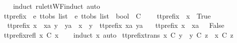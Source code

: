 \begin{isabellebody}
%
\isadelimproof
\ \ %
\endisadelimproof
%
\isatagproof
{}\isamarkupfalse%
\ {\isacharparenleft}induct\ rule{\isacharcolon}ttWF{}{\isachardot}induct{\isacharcomma}\ auto{\isacharparenright}%
\endisatagproof
{\isafoldproof}%
%
\isadelimproof
%
\endisadelimproof
%
\isadelimdocument
%
\endisadelimdocument
%
\isatagdocument
%
\isamarkuptrue%
%
\isamarkuptrue%
%
\endisatagdocument
{\isafolddocument}%
%
\isadelimdocument
%
\endisadelimdocument
{}\isamarkupfalse%
\ tt{\isacharunderscore}prefix\ {\isacharcolon}{\isacharcolon}\ {\isachardoublequoteopen}{\isacharprime}e\ ttobs\ list\ {\isasymRightarrow}\ {\isacharprime}e\ ttobs\ list\ {\isasymRightarrow}\ bool{\isachardoublequoteclose}\ {\isacharparenleft}\ {\isachardoublequoteopen}{\isasymle}\isactrlsub C{\isachardoublequoteclose}\ {}{}{\isacharparenright}\ \isanewline
\ \ {\isachardoublequoteopen}tt{\isacharunderscore}prefix\ {\isacharbrackleft}{\isacharbrackright}\ x\ {\isacharequal}\ True{\isachardoublequoteclose}\ {\isacharbar}\isanewline
\ \ {\isachardoublequoteopen}tt{\isacharunderscore}prefix\ {\isacharparenleft}x\ {\isacharhash}\ xa{\isacharparenright}\ {\isacharparenleft}y\ {\isacharhash}\ ya{\isacharparenright}\ {\isacharequal}\ {\isacharparenleft}x\ {\isacharequal}\ y\ {\isasymand}\ tt{\isacharunderscore}prefix\ xa\ ya{\isacharparenright}{\isachardoublequoteclose}\ {\isacharbar}\isanewline
\ \ {\isachardoublequoteopen}tt{\isacharunderscore}prefix\ {\isacharparenleft}x\ {\isacharhash}\ xa{\isacharparenright}\ {\isacharbrackleft}{\isacharbrackright}\ {\isacharequal}\ False{\isachardoublequoteclose}\isanewline
\isanewline
{}\isamarkupfalse%
\ tt{\isacharunderscore}prefix{\isacharunderscore}refl{\isacharcolon}\ {\isachardoublequoteopen}x\ {\isasymle}\isactrlsub C\ x{\isachardoublequoteclose}\isanewline
%
\isadelimproof
\ \ %
\endisadelimproof
%
\isatagproof
{}\isamarkupfalse%
\ {\isacharparenleft}induct\ x{\isacharcomma}\ auto{\isacharparenright}%
\endisatagproof
{\isafoldproof}%
%
\isadelimproof
\isanewline
%
\endisadelimproof
\isanewline
{}\isamarkupfalse%
\ tt{\isacharunderscore}prefix{\isacharunderscore}trans{\isacharcolon}\ {\isachardoublequoteopen}x\ {\isasymle}\isactrlsub C\ y\ {\isasymLongrightarrow}\ y\ {\isasymle}\isactrlsub C\ z\ {\isasymLongrightarrow}\ x\ {\isasymle}\isactrlsub C\ z{\isachardoublequoteclose}\isanewline
%
\isadelimproof
%
\endisadelimproof
%
\isatagproof
{}\isamarkupfalse%

\end{isabellebody}

